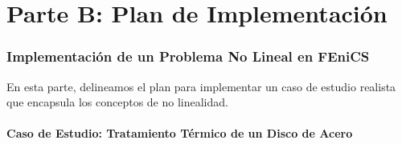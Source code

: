 \part*{Parte B: Plan de Implementación}

\section{Implementación de un Problema No Lineal en FEniCS}
En esta parte, delineamos el plan para implementar un caso de estudio realista que encapsula los conceptos de no linealidad.

\subsection{Caso de Estudio: Tratamiento Térmico de un Disco de Acero}
